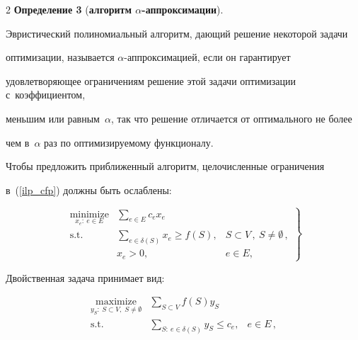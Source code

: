 \begin{multicols}{2}
\textbf{Определение 3} (\textbf{алгоритм $\alpha$-аппроксимации}).

Эвристический полиномиальный алгоритм, дающий решение некоторой задачи 

оптимизации, называется $\alpha$-ап\-прок\-си\-ма\-ци\-ей, если он гарантирует 

удовлетворяющее ограничениям решение этой задачи оптимизации с~коэффициентом, 

меньшим или равным~$\alpha$, так что решение отличается от оптимального не более 

чем в~$\alpha$ раз по оптимизируемому функционалу.





\smallskip



Чтобы предложить приближенный алгоритм, целочисленные ограничения 

в~(\ref{ilp_cfp}) должны быть ослаблены:

\begin{equation}

\left.

\begin{array}{rll}

\underset{x_e:~e\in E}{\mbox{minimize}} & \displaystyle \sum\limits_{e\in E}c_ex_e \\[6pt]

\mbox{s.t.} & \displaystyle \sum\limits_{e\in \delta(S)}x_e\geqslant f(S), & S \subset V\,, \ S \not= \emptyset\,,\\[6pt]

& x_e>0, & e\in E,

\end{array}

\right\}

\label{rlp_cfp}

\end{equation}

Двойственная задача принимает вид:

\begin{equation}

\left.

\begin{array}{rll}

\underset{y_S:~S \subset V, \; S \not= \emptyset}{\mbox{maximize}} & 

\displaystyle \sum\limits_{S\subset V}f(S)y_S \\[6pt]

\mbox{s.t.} & \displaystyle \sum\limits_{S:~e\in \delta(S)}y_S\leqslant c_e, & e\in E\,,\\[6pt]


\end{array}
\end{equation}
\end{multicols}
